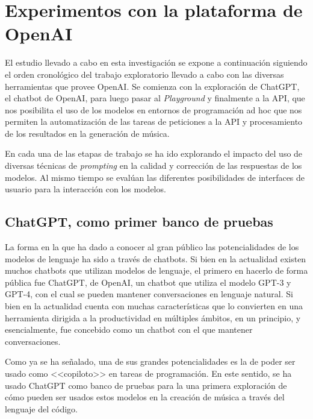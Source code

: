 
\chapter{Experimentos con la plataforma de OpenAI}


El estudio llevado a cabo en esta investigación se expone a continuación siguiendo el orden cronológico del trabajo exploratorio llevado a cabo con las diversas herramientas que provee OpenAI. Se comienza con la exploración de ChatGPT, el chatbot de OpenAI, para luego pasar al \textit{Playground} y finalmente a la API, que nos posibilita el uso de los modelos en entornos de programación ad hoc que nos permiten la automatización de las tareas de peticiones a la API y procesamiento de los resultados en la generación de música.

En cada una de las etapas de trabajo se ha ido explorando el impacto del uso de diversas técnicas de \textit{prompting} en la calidad y corrección de las respuestas de los modelos. Al mismo tiempo se evalúan las diferentes posibilidades de interfaces de usuario para la interacción con los modelos. 

\section{ChatGPT, como primer banco de pruebas}
La forma en la que ha dado a conocer al gran público las potencialidades de los modelos de lenguaje ha sido a través de chatbots. Si bien en la actualidad existen muchos chatbots que utilizan modelos de lenguaje, el primero en hacerlo de forma pública fue ChatGPT, de OpenAI, un chatbot que utiliza el modelo GPT-3 y GPT-4, con el cual se pueden mantener conversaciones en lenguaje natural. Si bien en la actualidad cuenta con muchas características que lo convierten en una herramienta dirigida a la productividad en múltiples ámbitos, en un principio, y esencialmente, fue concebido como un chatbot con el que mantener conversaciones.

Como ya se ha señalado, una de sus grandes potencialidades es la de poder ser usado como <<copiloto>> en tareas de programación. En este sentido, se ha usado ChatGPT como banco de pruebas para la una primera exploración de cómo pueden ser usados estos modelos en la creación de música a través del lenguaje del código.

